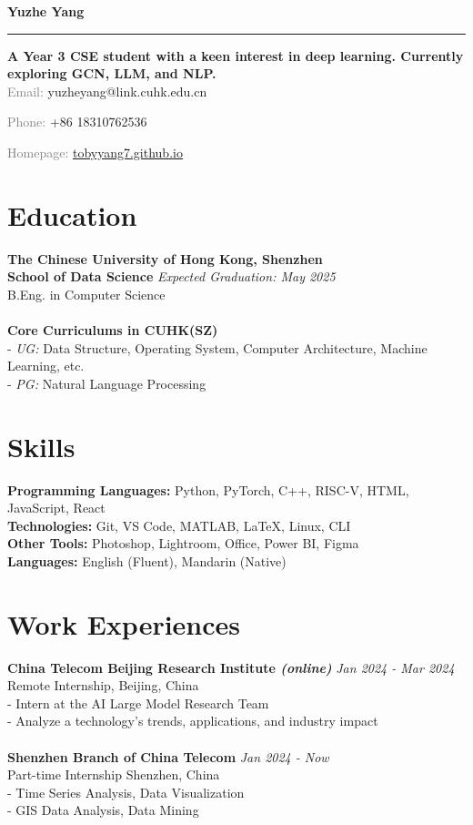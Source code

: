 \documentclass[a4paper,10pt]{article}
\newcommand{\name}[1]{\noindent\textbf{\LARGE #1}\vspace{0.5em}\hrule\vspace{1em}}
\newcommand{\contact}[2]{\noindent\textcolor{gray}{#1:} #2\par}
\begin{document}
\name{Yuzhe Yang}

\textbf{A Year 3 CSE student with a keen interest in deep learning. Currently exploring GCN, LLM, and NLP.\\}
\contact{Email}{yuzheyang@link.cuhk.edu.cn}
\contact{Phone}{+86 18310762536}
\contact{Homepage}{\href{https://tobyyang7.github.io/}{tobyyang7.github.io}}

\section*{Education}
\textbf{The Chinese University of Hong Kong, Shenzhen\\ \textbf{School of Data Science}} \hfill \textit{Expected Graduation: May 2025}\\
B.Eng. in Computer Science\\
\\
\textbf{Core Curriculums in CUHK(SZ)}
\\- \textit{UG:} Data Structure, Operating System, Computer Architecture, Machine Learning, etc.
\\- \textit{PG:} Natural Language Processing


\section*{Skills}
\textbf{Programming Languages:} Python, PyTorch, C++, RISC-V, HTML, JavaScript, React\\
\textbf{Technologies:} Git, VS Code, MATLAB, \LaTeX, Linux, CLI\\
\textbf{Other Tools:} Photoshop, Lightroom, Office, Power BI, Figma\\
\textbf{Languages:} English (Fluent), Mandarin (Native)

\section*{Work Experiences}
\textbf{China Telecom Beijing Research Institute \textit{(online)}} \hfill \textit{Jan 2024 - Mar 2024}\\
Remote Internship, Beijing, China\\
- Intern at the AI Large Model Research Team\\
- Analyze a technology's trends, applications, and industry impact\\
\\
\textbf{Shenzhen Branch of China Telecom} \hfill \textit{Jan 2024 - Now}\\
Part-time Internship \hfill Shenzhen, China\\
- Time Series Analysis, Data Visualization\\
- GIS Data Analysis, Data Mining
\end{document}
